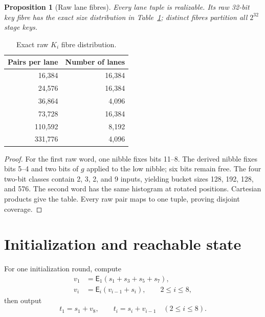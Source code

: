 \documentclass[10pt]{article}
\newcommand{\toprule}{\hline}
\newcommand{\midrule}{\hline}
\newcommand{\bottomrule}{\hline}}
\theoremstyle{plain}
\newtheorem{proposition}[theorem]{Proposition}
\theoremstyle{definition}
\theoremstyle{remark}
\newcommand{\E}{\mathsf E}
\begin{document}
\begin{proposition}[Raw lane fibres]
\label{prop:fibres}
Every lane tuple is realizable.  Its raw 32-bit key fibre has the exact size
distribution in Table~\ref{tab:fibres}; distinct fibres partition all
\(2^{32}\) stage keys.
\end{proposition}
\begin{table}[ht]
\centering
\caption{Exact raw \(K_i\) fibre distribution.}
\label{tab:fibres}
\begin{tabular}{rr}
\toprule
Pairs per lane & Number of lanes \\ \midrule
16,384&16,384\\24,576&16,384\\36,864&4,096\\
73,728&16,384\\110,592&8,192\\331,776&4,096\\ \bottomrule
\end{tabular}
\end{table}
\begin{proof}
For the first raw word, one nibble fixes bits 11--8.  The derived nibble fixes
bits 5--4 and two bits of \(g\) applied to the low nibble; six bits remain
free.  The four two-bit classes contain 2, 3, 2, and 9 inputs, yielding bucket
sizes 128, 192, 128, and 576.  The second word has the same histogram at
rotated positions.  Cartesian products give the table.  Every raw pair maps
to one tuple, proving disjoint coverage.
\end{proof}

\section{Initialization and reachable state}
\label{sec:init}

For one initialization round, compute
\begin{align}
v_1&=\E_1(s_1+s_3+s_5+s_7),\nonumber\\
v_i&=\E_i(v_{i-1}+s_i),\qquad2\leq i\leq8,
\end{align}
then output
\begin{equation}
t_1=s_1+v_8,\qquad t_i=s_i+v_{i-1}\quad(2\leq i\leq8).
\label{eq:initround}
\end{equation}
\end{document}
